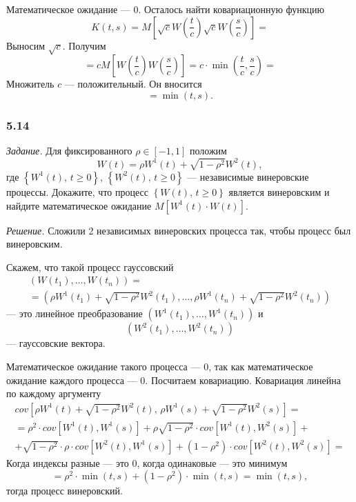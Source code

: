 \begin{enumerate}[label=\alph*)]
  Математическое ожидание --- 0.
  Осталось найти ковариационную функцию
  $$K \left( t, s \right) =
    M \left[ \sqrt{c} W \left( \frac{t}{c} \right) \sqrt{c} W \left( \frac{s}{c} \right) \right] =$$
  Выносим $ \sqrt{c}$.
  Получим
  $$= cM \left[ W \left( \frac{t}{c} \right) W \left( \frac{s}{c} \right) \right] =
  c \cdot \min \left( \frac{t}{c}, \frac{s}{c} \right) =$$
  Множитель $c$ --- положительный.
  Он вносится
  $$= \min \left( t, s \right).$$
\end{enumerate}

\subsubsection*{5.14}

\textit{Задание.}
Для фиксированного $ \rho \in \left[ -1, 1 \right] $ положим
$$W \left( t \right) = \rho W^1 \left( t \right) + \sqrt{1 - \rho^2} W^2 \left( t \right),$$
где
$ \left\{ W^1 \left( t \right), \, t \geq 0 \right\}, \,
  \left\{ W^2 \left( t \right), \, t \geq 0 \right\} $
--- независимые винеровские процессы.
Докажите, что процесс $ \left\{ W \left( t \right), \, t \geq 0 \right\} $
является винеровским и найдите математическое ожидание
$M \left[ W^1 \left( t \right) \cdot W \left( t \right) \right] $.

\textit{Решение.}
Сложили 2 независимых винеровских процесса так, чтобы процесс был винеровским.

Скажем, что такой процесс гауссовский
\begin{gather*}
  \left( W \left( t_1 \right), \dotsc, W \left( t_n \right) \right) = \\
  = \left(
    \rho W^1 \left( t_1 \right) + \sqrt{1 - \rho^2} W^2 \left( t_1 \right), \dotsc,
    \rho W^1 \left( t_n \right) + \sqrt{1 - \rho^2} W^2 \left( t_n \right) \right)
\end{gather*}
--- это линейное преобразование
$ \left( W^1 \left( t_1 \right), \dotsc, W^1 \left( t_n \right) \right) $ и
$$ \left( W^2 \left( t_1 \right), \dotsc, W^2 \left( t_n \right) \right) $$
--- гауссовские вектора.

Математическое ожидание такого процесса --- 0, так как математическое ожидание каждого процесса ---
0.
Посчитаем ковариацию.
Ковариация линейна по каждому аргументу
\begin{gather*}
  cov \left[
    \rho W^1 \left( t \right) + \sqrt{1 - \rho^2} W^2 \left( t \right), \,
    \rho W^1 \left( s \right) + \sqrt{1 - \rho^2} W^2 \left( s \right) \right] = \\
  = \rho^2 \cdot cov \left[ W^1 \left( t \right), W^1 \left( s \right) \right] +
  \rho \sqrt{1 - \rho^2} \cdot cov \left[ W^1 \left( t \right), W^2 \left( s \right) \right] + \\
  + \sqrt{1 - \rho^2} \cdot \rho \cdot
  cov \left[ W^2 \left( t \right), W^1 \left( s \right) \right] +
  \left( 1 - \rho^2 \right) \cdot cov \left[ W^2 \left( t \right), W^2 \left( s \right) \right] =
\end{gather*}
Когда индексы разные --- это 0, когда одинаковые --- это минимум
$$= \rho^2 \cdot \min \left( t, s \right) +
  \left( 1 - \rho^2 \right) \cdot \min \left( t, s \right) =
  \min \left( t, s \right),$$
тогда процесс винеровский.


